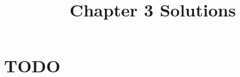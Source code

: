 \documentclass[12pt]{article}
\title{Chapter 3 Solutions}
\begin{document}
\section{TODO}
\end{document}
